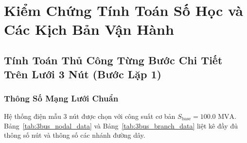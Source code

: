 \documentclass[12pt,a4paper,oneside]{report}
\begin{document}
\chapter{Kiểm Chứng Tính Toán Số Học và Các Kịch Bản Vận Hành}

\section{Tính Toán Thủ Công Từng Bước Chi Tiết Trên Lưới 3 Nút (Bước Lặp 1)}

\subsection{Thông Số Mạng Lưới Chuẩn}
Hệ thống điện mẫu 3 nút được chọn với công suất cơ bản $S_{\text{base}} = 100.0\text{ MVA}$. Bảng~\ref{tab:3bus_nodal_data} và Bảng~\ref{tab:3bus_branch_data} liệt kê đầy đủ thông số nút và thông số các nhánh đường dây.

\begin{table}[H]
\centering
\caption{Thông số nút của hệ thống điện mẫu 3 nút.}
\label{tab:3bus_nodal_data}
\end{table}

\begin{table}[H]
\centering
\caption{Thông số nhánh đường dây trên hệ đơn vị tương đối ($S_{\text{base}} = 100.0\text{ MVA}$).}
\label{tab:3bus_branch_data}
\end{table}
\end{document}
